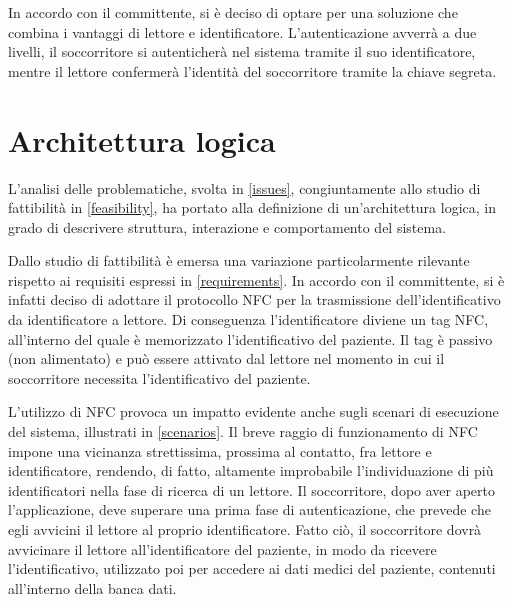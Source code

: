 \documentclass[a4paper,12pt]{report}
\begin{document}
In accordo con il committente, si è deciso di optare per una soluzione che combina i vantaggi di lettore e identificatore. L'autenticazione avverrà a due livelli, il soccorritore si autenticherà nel sistema tramite il suo identificatore, mentre il lettore confermerà l'identità del soccorritore tramite la chiave segreta.  

\section{Architettura logica} \label{logic_architecture}
L'analisi delle problematiche, svolta in \autoref{issues}, congiuntamente allo studio di fattibilità in \autoref{feasibility}, ha portato alla definizione di un'architettura logica, in grado di descrivere struttura, interazione e comportamento del sistema.

Dallo studio di fattibilità è emersa una variazione particolarmente rilevante rispetto ai requisiti espressi in \autoref{requirements}. In accordo con il committente, si è infatti deciso di adottare il protocollo NFC per la trasmissione dell'identificativo da identificatore a lettore. Di conseguenza l'identificatore diviene un tag NFC, all'interno del quale è memorizzato l'identificativo del paziente. Il tag è passivo (non alimentato) e può essere attivato dal lettore nel momento in cui il soccorritore necessita l'identificativo del paziente.

L'utilizzo di NFC provoca un impatto evidente anche sugli scenari di esecuzione del sistema, illustrati in \autoref{scenarios}. Il breve raggio di funzionamento di NFC impone una vicinanza strettissima, prossima al contatto, fra lettore e identificatore, rendendo, di fatto, altamente improbabile l'individuazione di più identificatori nella fase di ricerca di un lettore. Il soccorritore, dopo aver aperto l'applicazione, deve superare una prima fase di autenticazione, che prevede che egli avvicini il lettore al proprio identificatore. Fatto ciò, il soccorritore dovrà avvicinare il lettore all'identificatore del paziente, in modo da ricevere l'identificativo, utilizzato poi per accedere ai dati medici del paziente, contenuti all'interno della banca dati. 
\end{document}
